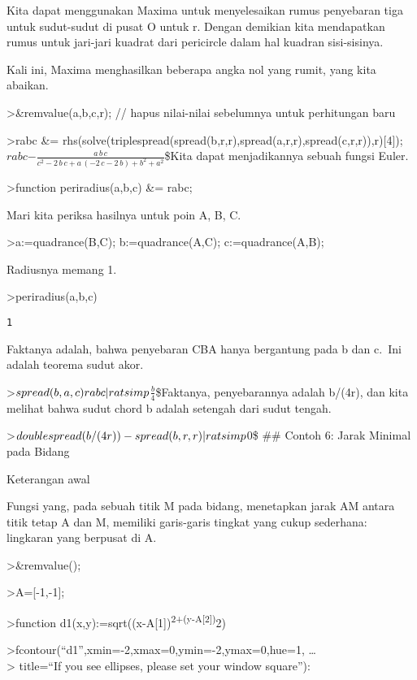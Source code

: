 \documentclass[
]{book}
\begin{document}
Kita dapat menggunakan Maxima untuk menyelesaikan rumus penyebaran tiga untuk sudut-sudut di pusat O untuk r. Dengan demikian kita mendapatkan rumus untuk jari-jari kuadrat dari pericircle dalam hal kuadran sisi-sisinya.

Kali ini, Maxima menghasilkan beberapa angka nol yang rumit, yang kita abaikan.

\textgreater\&remvalue(a,b,c,r); // hapus nilai-nilai sebelumnya untuk perhitungan baru

\textgreater rabc \&= rhs(solve(triplespread(spread(b,r,r),spread(a,r,r),spread(c,r,r)),r){[}4{]}); \(rabc\)\(-\frac{a\,b\,c}{c^2-2\,b\,c+a\,\left(-2\,c-2\,b\right)+b^2+a^2}\)\$Kita dapat menjadikannya sebuah fungsi Euler.

\textgreater function periradius(a,b,c) \&= rabc;

Mari kita periksa hasilnya untuk poin A, B, C.

\textgreater a:=quadrance(B,C); b:=quadrance(A,C); c:=quadrance(A,B);

Radiusnya memang 1.

\textgreater periradius(a,b,c)

\begin{verbatim}
1
\end{verbatim}

Faktanya adalah, bahwa penyebaran CBA hanya bergantung pada b dan c.~Ini adalah teorema sudut akor.

\textgreater{}\(spread(b,a,c)\*rabc | ratsimp\)\(\frac{b}{4}\)\$Faktanya, penyebarannya adalah b/(4r), dan kita melihat bahwa sudut chord b adalah setengah dari sudut tengah.

\textgreater{}\(doublespread(b/(4\*r))-spread(b,r,r) | ratsimp\)\(0\)\$ \#\# Contoh 6: Jarak Minimal pada Bidang

Keterangan awal

Fungsi yang, pada sebuah titik M pada bidang, menetapkan jarak AM antara titik tetap A dan M, memiliki garis-garis tingkat yang cukup sederhana: lingkaran yang berpusat di A.

\textgreater\&remvalue();

\textgreater A={[}-1,-1{]};

\textgreater function d1(x,y):=sqrt((x-A{[}1{]})\textsuperscript{2+(y-A{[}2{]})}2)

\textgreater fcontour(``d1'',xmin=-2,xmax=0,ymin=-2,ymax=0,hue=1, \ldots{}\\
\textgreater{} title=``If you see ellipses, please set your window square''):
\end{document}
